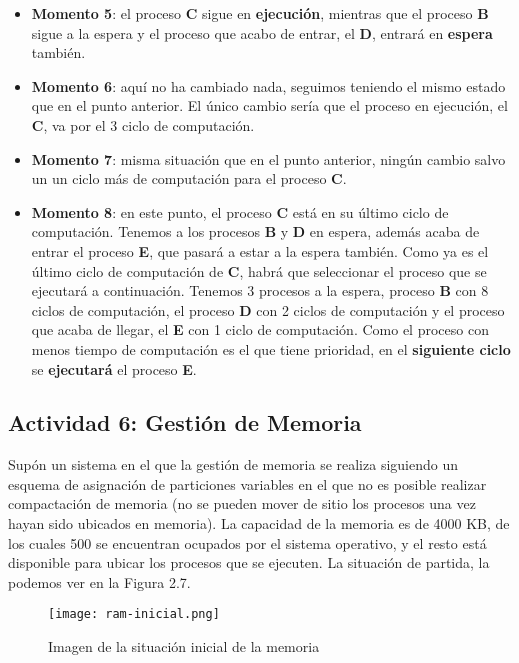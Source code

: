 \begin{enumerate}
\begin{itemize}
        \item \textbf{Momento 5}: el proceso \textbf{C} sigue en \textbf{ejecución}, mientras que el proceso \textbf{B} sigue a la espera y el proceso que acabo de entrar, el \textbf{D}, entrará en \textbf{espera} también.

        \item \textbf{Momento 6}: aquí no ha cambiado nada, seguimos teniendo el mismo estado que en el punto anterior. El único cambio sería que el proceso en ejecución, el \textbf{C}, va por el 3 ciclo de computación.

        \item \textbf{Momento 7}: misma situación que en el punto anterior, ningún cambio salvo un un ciclo más de computación para el proceso \textbf{C}.

        \item \textbf{Momento 8}: en este punto, el proceso \textbf{C} está en su último ciclo de computación. Tenemos a los procesos \textbf{B} y \textbf{D} en espera, además acaba de entrar el proceso \textbf{E}, que pasará a estar a la espera también.  Como ya es el último ciclo de computación de \textbf{C}, habrá que seleccionar el proceso que se ejecutará a continuación. Tenemos 3 procesos a la espera, proceso \textbf{B} con 8 ciclos de computación, el proceso \textbf{D} con 2 ciclos de computación y el proceso que acaba de llegar, el \textbf{E} con 1 ciclo de computación. Como el proceso con menos tiempo de computación es el que tiene prioridad, en el \textbf{siguiente ciclo} se \textbf{ejecutará} el proceso \textbf{E}.
    \end{itemize}
\end{enumerate}

\subsection{Actividad 6: Gestión de Memoria}
Supón un sistema en el que la gestión de memoria se realiza siguiendo un esquema de asignación de particiones variables en el que no es posible realizar compactación de memoria (no se pueden mover de sitio los procesos una vez hayan sido ubicados en memoria). La capacidad de la memoria es de 4000 KB, de los cuales 500 se encuentran ocupados por el sistema operativo, y el resto está disponible para ubicar los procesos que se ejecuten. La situación de partida, la podemos ver en la Figura 2.7.

\newpage

\begin{figure}[ht]
    \centering
    \texttt{[image: ram-inicial.png]}
    \caption{Imagen de la situación inicial de la memoria}
\end{figure}

